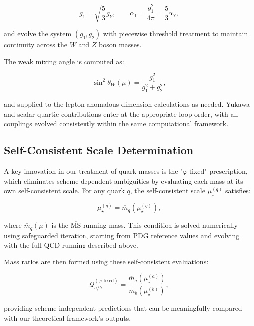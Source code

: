 \documentclass[%
amsmath,amssymb,
aps,
prb,
floatfix,
twocolumn
]{revtex4-2}
\begin{document}
\begin{equation}
g_1 = \sqrt{\frac{5}{3}} g_Y, \qquad \alpha_1 = \frac{g_1^2}{4\pi} = \frac{5}{3}\alpha_Y,
\label{eq:gut_normalization}
\end{equation}

and evolve the system $(g_1, g_2)$ with piecewise threshold treatment to maintain continuity across the $W$ and $Z$ boson masses.

The weak mixing angle is computed as:

\begin{equation}
\sin^2\theta_W(\mu) = \frac{g_1^2}{g_1^2 + g_2^2},
\label{eq:weak_mixing_angle}
\end{equation}

and supplied to the lepton anomalous dimension calculations as needed. Yukawa and scalar quartic contributions enter at the appropriate loop order, with all couplings evolved consistently within the same computational framework.

\subsection{Self-Consistent Scale Determination}
\label{subsec:self_consistent_scales}

A key innovation in our treatment of quark masses is the "$\varphi$-fixed" prescription, which eliminates scheme-dependent ambiguities by evaluating each mass at its own self-consistent scale. For any quark $q$, the self-consistent scale $\mu_\star^{(q)}$ satisfies:

\begin{equation}
\mu_\star^{(q)} = \overline{m}_q(\mu_\star^{(q)}),
\label{eq:self_consistent_scale}
\end{equation}

where $\overline{m}_q(\mu)$ is the $\overline{\text{MS}}$ running mass. This condition is solved numerically using safeguarded iteration, starting from PDG reference values and evolving with the full QCD running described above.

Mass ratios are then formed using these self-consistent evaluations:

\begin{equation}
\mathcal{Q}_{a/b}^{(\varphi\text{-fixed})} = \frac{\overline{m}_a(\mu_\star^{(a)})}{\overline{m}_b(\mu_\star^{(b)})},
\label{eq:phi_fixed_ratio}
\end{equation}

providing scheme-independent predictions that can be meaningfully compared with our theoretical framework's outputs.
\end{document}
